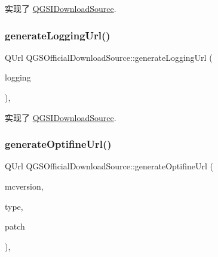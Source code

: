 实现了 \mbox{\hyperlink{class_q_g_s_i_download_source_a276656b21753de8384d457def7c23701}{Q\+G\+S\+I\+Download\+Source}}.

\mbox{\label{class_q_g_s_official_download_source_a83a502b4513eb1286bc97a863ddf980c}} 
\subsubsection{\texorpdfstring{generate\+Logging\+Url()}{generateLoggingUrl()}}
{\footnotesize\ttfamily Q\+Url Q\+G\+S\+Official\+Download\+Source\+::generate\+Logging\+Url (\begin{DoxyParamCaption}\item[{const \mbox{\hyperlink{class_q_g_s_logging}{Q\+G\+S\+Logging}} \&}]{logging }\end{DoxyParamCaption})\hspace{0.3cm}{\ttfamily [override]}, {\ttfamily [virtual]}}



实现了 \mbox{\hyperlink{class_q_g_s_i_download_source_aae93e5aba009f01df11cbbc6aacac96f}{Q\+G\+S\+I\+Download\+Source}}.

\mbox{\label{class_q_g_s_official_download_source_a0bcd5b86c818cdd76195e16ccddb23da}} 
\subsubsection{\texorpdfstring{generate\+Optifine\+Url()}{generateOptifineUrl()}}
{\footnotesize\ttfamily Q\+Url Q\+G\+S\+Official\+Download\+Source\+::generate\+Optifine\+Url (\begin{DoxyParamCaption}\item[{const Q\+String \&}]{mcversion,  }\item[{const Q\+String \&}]{type,  }\item[{const Q\+String \&}]{patch }\end{DoxyParamCaption})\hspace{0.3cm}{\ttfamily [override]}, {\ttfamily [virtual]}}



